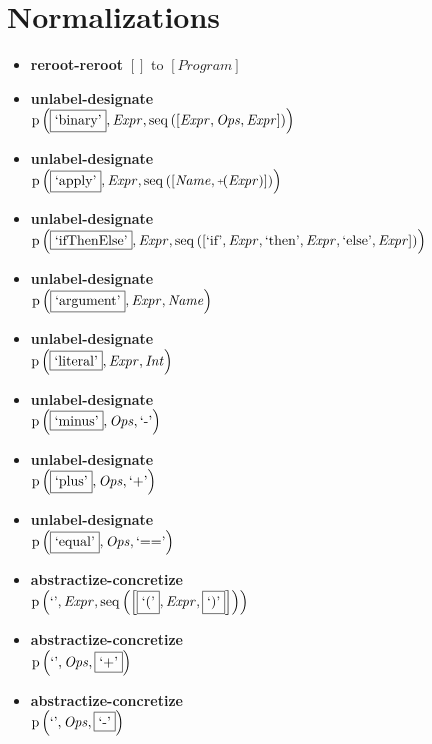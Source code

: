 \section{Normalizations}
{\footnotesize\begin{itemize}
\item \textbf{reroot-reroot} $\left[\right]$ to $\left[\mathit{Program}\right]$
\item \textbf{unlabel-designate}\\$\mathrm{p}\left(\fbox{\text{`binary'}},\mathit{Expr},\mathrm{seq}\left(\left[\mathit{Expr}, \mathit{Ops}, \mathit{Expr}\right]\right)\right)$
\item \textbf{unlabel-designate}\\$\mathrm{p}\left(\fbox{\text{`apply'}},\mathit{Expr},\mathrm{seq}\left(\left[\mathit{Name}, \plus \left(\mathit{Expr}\right)\right]\right)\right)$
\item \textbf{unlabel-designate}\\$\mathrm{p}\left(\fbox{\text{`ifThenElse'}},\mathit{Expr},\mathrm{seq}\left(\left[\text{`if'}, \mathit{Expr}, \text{`then'}, \mathit{Expr}, \text{`else'}, \mathit{Expr}\right]\right)\right)$
\item \textbf{unlabel-designate}\\$\mathrm{p}\left(\fbox{\text{`argument'}},\mathit{Expr},\mathit{Name}\right)$
\item \textbf{unlabel-designate}\\$\mathrm{p}\left(\fbox{\text{`literal'}},\mathit{Expr},\mathit{Int}\right)$
\item \textbf{unlabel-designate}\\$\mathrm{p}\left(\fbox{\text{`minus'}},\mathit{Ops},\text{`-'}\right)$
\item \textbf{unlabel-designate}\\$\mathrm{p}\left(\fbox{\text{`plus'}},\mathit{Ops},\text{`+'}\right)$
\item \textbf{unlabel-designate}\\$\mathrm{p}\left(\fbox{\text{`equal'}},\mathit{Ops},\text{`=='}\right)$
\item \textbf{abstractize-concretize}\\$\mathrm{p}\left(\text{`'},\mathit{Expr},\mathrm{seq}\left(\left[\fbox{$\text{`('}$}, \mathit{Expr}, \fbox{$\text{`)'}$}\right]\right)\right)$
\item \textbf{abstractize-concretize}\\$\mathrm{p}\left(\text{`'},\mathit{Ops},\fbox{$\text{`+'}$}\right)$
\item \textbf{abstractize-concretize}\\$\mathrm{p}\left(\text{`'},\mathit{Ops},\fbox{$\text{`-'}$}\right)$

\end{itemize}}
